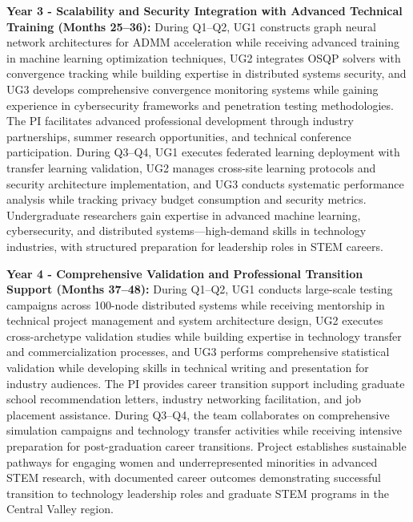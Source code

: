 \documentclass[12pt]{article}
\begin{document}
\textbf{Year 3 - Scalability and Security Integration with Advanced Technical Training (Months 25--36):} During Q1--Q2, UG1 constructs graph neural network architectures for ADMM acceleration while receiving advanced training in machine learning optimization techniques, UG2 integrates OSQP solvers with convergence tracking while building expertise in distributed systems security, and UG3 develops comprehensive convergence monitoring systems while gaining experience in cybersecurity frameworks and penetration testing methodologies. The PI facilitates advanced professional development through industry partnerships, summer research opportunities, and technical conference participation. During Q3--Q4, UG1 executes federated learning deployment with transfer learning validation, UG2 manages cross-site learning protocols and security architecture implementation, and UG3 conducts systematic performance analysis while tracking privacy budget consumption and security metrics. Undergraduate researchers gain expertise in advanced machine learning, cybersecurity, and distributed systems---high-demand skills in technology industries, with structured preparation for leadership roles in STEM careers.

\textbf{Year 4 - Comprehensive Validation and Professional Transition Support (Months 37--48):} During Q1--Q2, UG1 conducts large-scale testing campaigns across 100-node distributed systems while receiving mentorship in technical project management and system architecture design, UG2 executes cross-archetype validation studies while building expertise in technology transfer and commercialization processes, and UG3 performs comprehensive statistical validation while developing skills in technical writing and presentation for industry audiences. The PI provides career transition support including graduate school recommendation letters, industry networking facilitation, and job placement assistance. During Q3--Q4, the team collaborates on comprehensive simulation campaigns and technology transfer activities while receiving intensive preparation for post-graduation career transitions. Project establishes sustainable pathways for engaging women and underrepresented minorities in advanced STEM research, with documented career outcomes demonstrating successful transition to technology leadership roles and graduate STEM programs in the Central Valley region.
\vspace{-0.7cm}
\end{document}

